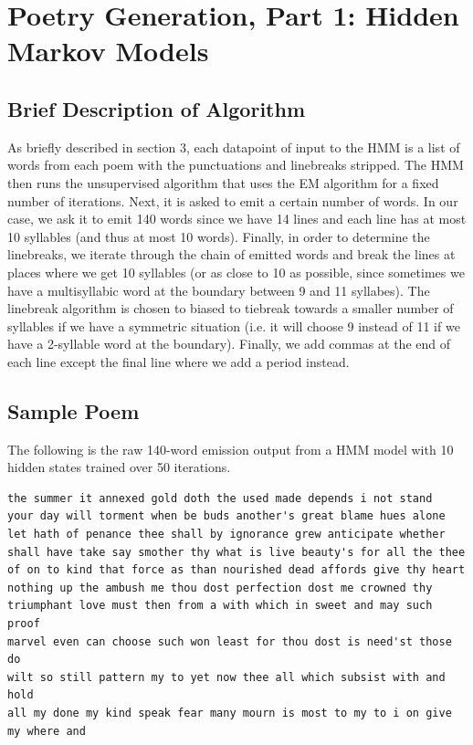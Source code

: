 \section{Poetry Generation, Part 1: Hidden Markov Models}
\subsection*{Brief Description of Algorithm}
As briefly described in section 3, each datapoint of input to the HMM is a list of words from each poem with the punctuations and linebreaks stripped. The HMM then runs the unsupervised algorithm that uses the EM algorithm for a fixed number of iterations. Next, it is asked to emit a certain number of words. In our case, we ask it to emit 140 words since we have 14 lines and each line has at most 10 syllables (and thus at most 10 words). Finally, in order to determine the linebreaks, we iterate through the chain of emitted words and break the lines at places where we get 10 syllables (or as close to 10 as possible, since sometimes we have a multisyllabic word at the boundary between 9 and 11 syllabes). The linebreak algorithm is chosen to biased to tiebreak towards a smaller number of syllables if we have a symmetric situation (i.e. it will choose 9 instead of 11 if we have a 2-syllable word at the boundary). Finally, we add commas at the end of each line except the final line where we add a period instead.
\subsection*{Sample Poem}
The following is the raw 140-word emission output from a HMM model with 10 hidden states trained over 50 iterations.

\begin{lstlisting}
the summer it annexed gold doth the used made depends i not stand 
your day will torment when be buds another's great blame hues alone 
let hath of penance thee shall by ignorance grew anticipate whether 
shall have take say smother thy what is live beauty's for all the thee
of on to kind that force as than nourished dead affords give thy heart
nothing up the ambush me thou dost perfection dost me crowned thy 
triumphant love must then from a with which in sweet and may such proof 
marvel even can choose such won least for thou dost is need'st those do 
wilt so still pattern my to yet now thee all which subsist with and hold 
all my done my kind speak fear many mourn is most to my to i on give 
my where and
\end{lstlisting}

